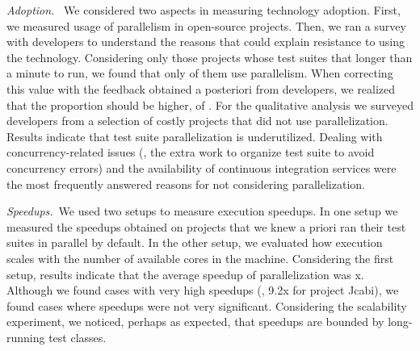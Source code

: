 \vspace{1ex}\noindent\emph{Adoption.}~ We considered two aspects in
measuring technology adoption.  First, we measured usage of
parallelism in open-source projects.  Then, we ran a survey with
developers to understand the reasons that could explain resistance to
using the technology.  Considering only those projects whose test suites
that longer than a minute to run, we found that only
\percentParallel{} of them use parallelism.  When correcting this
value with the feedback obtained a posteriori from developers, we
realized that the proportion should be higher, of
\percentParallelUpdated{}.  For the qualitative analysis we surveyed
developers from a selection of costly projects that did not use
parallelization.  Results indicate that test suite parallelization is
underutilized.  Dealing with concurrency-related issues (\eg{}, the
extra work to organize test suite to avoid concurrency errors) and the
availability of continuous integration services were the most
frequently answered reasons for not considering parallelization.


\vspace{1ex}\noindent\emph{Speedups.}~We used two setups to measure
execution speedups.  In one setup we measured the speedups obtained on
projects that we knew a priori ran their test suites in parallel by
default.  In the other setup, we evaluated how execution scales with
the number of available cores in the machine.  Considering the first setup, results
indicate that the average speedup of parallelization was
\avgSpeedup{}x.  Although we found cases with very high speedups
(\eg{}, 9.2x for project Jcabi), we found cases where speedups were
not very significant.  Considering the scalability experiment, we
noticed, perhaps as expected, that speedups are bounded by
long-running test classes.

